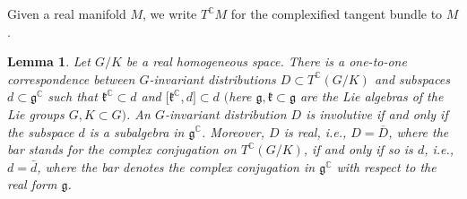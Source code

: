 \documentclass[pdftex]{sigma}
\numberwithin{equation}{section}
\newtheorem{Lemma}[Theorem]{Lemma}
\begin{document}
Given a real manifold $M$, we write $T^\mathbb{C} M$ for the complexified tangent bundle to $M$.

\begin{Lemma}\label{L3}Let $G/K$ be a real homogeneous space. There is a one-to-one correspondence between $G$-invariant distributions $D \subset T^\mathbb{C}(G/K)$ and subspaces $ d \subset\mathfrak{g}^\mathbb{C}$ such that $\mathfrak{k}^\mathbb{C} \subset d$ and $\big[\mathfrak{k}^\mathbb{C}, d\big]\subset d$ $($here $\mathfrak{g},\mathfrak{k} \subset\mathfrak{g}$ are the Lie algebras of the Lie groups $G, K \subset G)$. An $G$-invariant distribution $D$ is involutive if and only if the subspace $ d$ is a subalgebra in $\mathfrak{g}^\mathbb{C}$. Moreover, $D$ is real, i.e., $D=\overline D$, where the bar stands for the complex conjugation on $T^\mathbb{C}(G/K)$, if and only if so is $ d$, i.e., $d=\bar d$, where the bar denotes the complex conjugation in $\mathfrak{g}^\mathbb{C}$ with respect to the real form $\mathfrak{g}$.
\end{Lemma}
\end{document}
